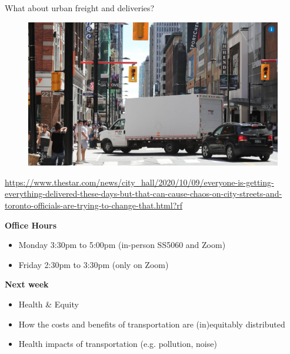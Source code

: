\documentclass[aspectratio=169]{beamer}
\begin{document}
\begin{frame}
	
	What about urban freight and deliveries?
	
	\begin{figure}
		
		\includegraphics[width=0.87\linewidth]{images/delivery.png}
		
	\end{figure}

	\tiny \url{https://www.thestar.com/news/city_hall/2020/10/09/everyone-is-getting-everything-delivered-these-days-but-that-can-cause-chaos-on-city-streets-and-toronto-officials-are-trying-to-change-that.html?rf}
	
\end{frame}




\begin{frame}
	
	\textbf{Office Hours}
	
	\begin{itemize}
		
		\item Monday 3:30pm to 5:00pm (in-person SS5060 and Zoom)
		\item Friday 2:30pm to 3:30pm (only on Zoom)
	\end{itemize}
	
	
	\textbf{Next week}
	
	\begin{itemize}
		\item Health \& Equity
		\item How the costs and benefits of transportation are (in)equitably distributed
		\item Health impacts of	transportation (e.g. pollution, noise)
	\end{itemize}
	
\end{frame}
\end{document}

